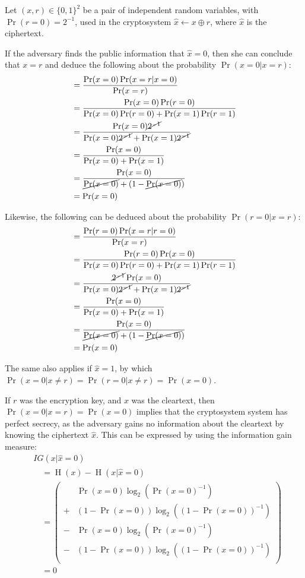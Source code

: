 \documentclass[twocolumn,hidelinks]{article}
\DeclareMathOperator{\entropy}{H}
\begin{document}
Let $(x,r) \in \{0,1\}^2$ be a pair of independent random variables, with
$\Pr(r=0)=2^{-1}$, used in the cryptosystem $\hat x \gets x \oplus r$,
where $\hat x$ is the ciphertext.

If the adversary finds the public information that $\hat x = 0$, then she
can conclude that $x=r$ and deduce the following about the probability
$\Pr(x=0 | x=r)$:
\[\begin{split}
    &= \frac{\Pr(x=0)\Pr(x=r | x=0)}{\Pr(x=r)} \\
    &= \frac{
        \Pr(x=0)\Pr(r=0)
       }{
        \Pr(x=0)\Pr(r=0) + \Pr(x=1)\Pr(r=1)
       } \\
    &= \frac{
        \Pr(x=0)\cancel{2^{-1}}
       }{
        \Pr(x=0)\cancel{2^{-1}} + \Pr(x=1)\cancel{2^{-1}}
       } \\
    &= \frac{\Pr(x=0)}{\Pr(x=0) + \Pr(x=1)} \\
    &= \frac{
        \Pr(x=0)
       }{
           \cancel{\Pr(x=0)} + (1 - \cancel{\Pr(x=0)})
       } \\
    &= \Pr(x=0)
\end{split}\]

Likewise, the following can be deduced about the probability $\Pr(r=0 |
x=r)$:
\[\begin{split}
    &= \frac{\Pr(r=0)\Pr(x=r | r=0)}{\Pr(x=r)} \\
    &= \frac{
        \Pr(r=0)\Pr(x=0)
       }{
        \Pr(x=0)\Pr(r=0) + \Pr(x=1)\Pr(r=1)
       } \\
    &= \frac{
        \cancel{2^{-1}}\Pr(x=0)
       }{
        \Pr(x=0)\cancel{2^{-1}} + \Pr(x=1)\cancel{2^{-1}}
       } \\
    &= \frac{\Pr(x=0)}{\Pr(x=0) + \Pr(x=1)} \\
    &= \frac{
        \Pr(x=0)
       }{
           \cancel{\Pr(x=0)} + (1 - \cancel{\Pr(x=0)})
       } \\
    &= \Pr(x=0)
\end{split}\]

The same also applies if $\hat x = 1$, by which $\Pr(x=0 | x \ne r) =
\Pr(r=0 | x \ne r) = \Pr(x=0)$.

If $r$ was the encryption key, and $x$ was the cleartext, then $\Pr(x=0 |
x=r) = \Pr(x=0)$ implies that the cryptosystem system has perfect secrecy,
as the adversary gains no information about the cleartext by knowing
the ciphertext $\hat x$.  This can be expressed by using the information
gain measure:
\[\begin{split}
    & IG(x|\hat x = 0) \\
    &\quad= \entropy(x) - \entropy(x|\hat x = 0)\\
    &\quad= \left(\begin{split}
          & \Pr(x=0)\log_2(\Pr(x=0)^{-1})\\
        + & (1-\Pr(x=0))\log_2((1-\Pr(x=0))^{-1})\\
        - & \Pr(x=0)\log_2(\Pr(x=0)^{-1})\\
        - & (1-\Pr(x=0))\log_2((1-\Pr(x=0))^{-1})\\
    \end{split}\right)\\
    &\quad= 0
\end{split}\]
\end{document}
